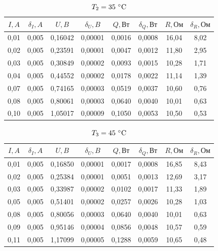 \documentclass[a4paper, 12pt]{article}
\begin{document}
\begin{table}[h!]
\begin{center}
\begin{tabular}{|c|c|c|c|c|c|c|c|}
\hline
$I, A$ & $\delta_I, A$ & $U, B$  & $\delta_U, B$ & $Q, Вт$ & $\delta_Q, Вт$ & $R, Ом$ & $\delta_R, Ом$ \\ \hline
0,01   & 0,005         & 0,16042 & 0,00001       & 0,0016  & 0,0008         & 16,04   & 8,02           \\ \hline
0,02   & 0,005         & 0,23591 & 0,00001       & 0,0047  & 0,0012         & 11,80   & 2,95           \\ \hline
0,03   & 0,005         & 0,30849 & 0,00002       & 0,0093  & 0,0015         & 10,28   & 1,71           \\ \hline
0,04   & 0,005         & 0,44552 & 0,00002       & 0,0178  & 0,0022         & 11,14   & 1,39           \\ \hline
0,07   & 0,005         & 0,74165 & 0,00003       & 0,0519  & 0,0037         & 10,60   & 0,76           \\ \hline
0,08   & 0,005         & 0,80061 & 0,00003       & 0,0640  & 0,0040         & 10,01   & 0,63           \\ \hline
0,10   & 0,005         & 1,05017 & 0,00009       & 0,1050  & 0,0053         & 10,50   & 0,53           \\ \hline
\end{tabular}
\caption{$T_2 = 35~\celsius$}
\label{tab2}
\end{center}
\end{table}

\begin{table}[h!]
\begin{center}
\begin{tabular}{|c|c|c|c|c|c|c|c|}
\hline
$I, A$ & $\delta_I, A$ & $U, B$  & $\delta_U, B$ & $Q, Вт$ & $\delta_Q, Вт$ & $R, Ом$ & $\delta_R, Ом$ \\ \hline
0,01   & 0,005         & 0,16850 & 0,00001       & 0,0017  & 0,0008         & 16,85   & 8,43           \\ \hline
0,02   & 0,005         & 0,25384 & 0,00001       & 0,0051  & 0,0013         & 12,69   & 3,17           \\ \hline
0,03   & 0,005         & 0,33987 & 0,00002       & 0,0102  & 0,0017         & 11,33   & 1,89           \\ \hline
0,05   & 0,005         & 0,51401 & 0,00002       & 0,0257  & 0,0026         & 10,28   & 1,03           \\ \hline
0,08   & 0,005         & 0,80056 & 0,00003       & 0,0640  & 0,0040         & 10,01   & 0,63           \\ \hline
0,09   & 0,005         & 0,95146 & 0,00004       & 0,0856  & 0,0048         & 10,57   & 0,59           \\ \hline
0,11   & 0,005         & 1,17099 & 0,00005       & 0,1288  & 0,0059         & 10,65   & 0,48           \\ \hline
\end{tabular}
\caption{$T_3 = 45~\celsius$}
\label{tab3}
\end{center}
\end{table}
\end{document}
